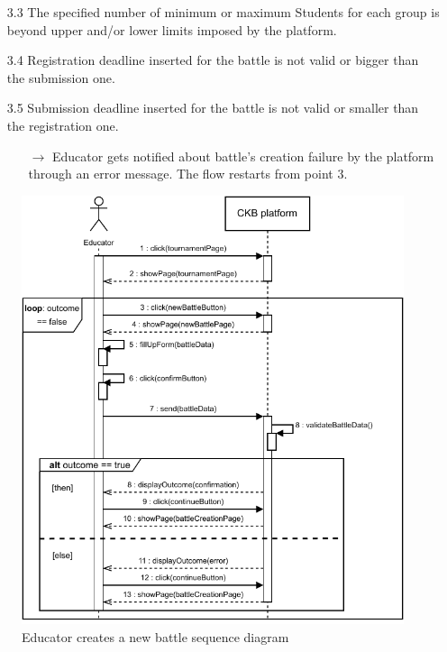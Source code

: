 \documentclass{article}
\begin{document}
{\begin{enumerate}
\begin{xltabular}{\textwidth}
\begin{itemize}
                        allowed programming languages.
                  \item[3.3] The specified number of minimum or maximum Students for each group
                        is beyond upper and/or lower limits imposed by the platform.
                  \item[3.4] Registration deadline inserted for the battle is not valid or
                        bigger than the submission one.
                  \item[3.5] Submission deadline inserted for the battle is not valid or
                        smaller than the registration one.
                        \begin{itemize}
                            \item[$\rightarrow$] Educator gets notified about battle's creation failure
                                  by the platform through an error message. The flow restarts from point 3.
                        \end{itemize}
              \end{itemize}
          \end{xltabular}

          \begin{figure}[H]
              \centering
              \includegraphics[scale=0.95]{SequenceDiagrams/Sequence6.pdf}
              \caption{Educator creates a new battle sequence diagram}
              \label{fig:BattleCreationSeqDiagram}
          \end{figure}


\end{enumerate}}
\end{document}
